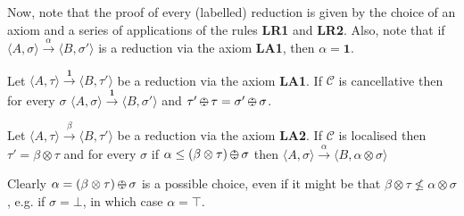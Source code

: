 \documentclass{llncs}
\def\1{{\mathbf 1}}
\def\C{{\mathcal C}}
\newcommand{\comment}[1]{}
\def\monid{{\mathbf 0}}
\def\1{{\mathbf 1}}
\def\C{{\mathcal C}}
\def\odiv{\, {\ominus\hspace{-7.7pt} \div} \,}
\def\monid{\mathbf{1}}
\begin{document}
Now, note that the proof of every (labelled) reduction is given by the choice of an axiom 
and a series of applications of the rules {\bf LR1} and  {\bf LR2}.
Also, note that if 
$\langle A, \sigma \rangle \xrightarrow{\alpha} \langle B, \sigma' \rangle$ is a reduction 
via the axiom {\bf LA1}, then $\alpha = \1$.

\begin{lemma}
\label{LA1}
Let $\langle A, \tau \rangle \xrightarrow{\monid} \langle B, \tau' \rangle$ be a reduction 
via the axiom {\bf LA1}. 
If $\C$ is cancellative then 
for every $\sigma$
$\langle A, \sigma \rangle \xrightarrow{\monid} \langle B, \sigma' \rangle$
and $\tau' \odiv \tau = \sigma' \odiv \sigma$.
\end{lemma}


\comment{
\begin{lemma}
\label{riminor}
Let $\langle A, \tau \rangle \xrightarrow{\beta} \langle B, \tau' \rangle$ with $\alpha \leq \beta$. 
%
If $\beta \neq \monid$ then $\langle A, \tau \rangle \xrightarrow{\alpha} \langle B, \tau' \otimes (\alpha \odiv \beta) \rangle$.
%
\end{lemma}

\todo{questo lemma ora serve?}
The lemma just states that the label in a reduction can always be strengthened,
as long as rule  {\bf LA1} is not used in the reduction labelled by $\beta$.
The proof exploits the premise of rule {\bf LA2} together with Lemma~\ref{l-mono},
and the condition $\beta \neq \monid$ is required in the inductive step for rule  {\bf LR2}.
}

\begin{lemma}
\label{LA2}
Let $\langle A, \tau \rangle \xrightarrow{\beta} \langle B, \tau' \rangle$ be a reduction 
via the axiom {\bf LA2}. If $\C$ is localised then $\tau' = \beta \otimes \tau$
and for every $\sigma$ if $\alpha \leq (\beta \otimes \tau) \odiv \sigma$ then
$\langle A, \sigma \rangle \xrightarrow{\alpha} \langle B, \alpha \otimes \sigma \rangle$
\end{lemma}


Clearly $\alpha = (\beta \otimes \tau) \odiv \sigma$ is a possible choice, even if 
it might be that $\beta \otimes \tau \not \leq \alpha \otimes \sigma$,
e.g. if $\sigma = \bot$, in which case $\alpha = \top$.


%
\end{document}
